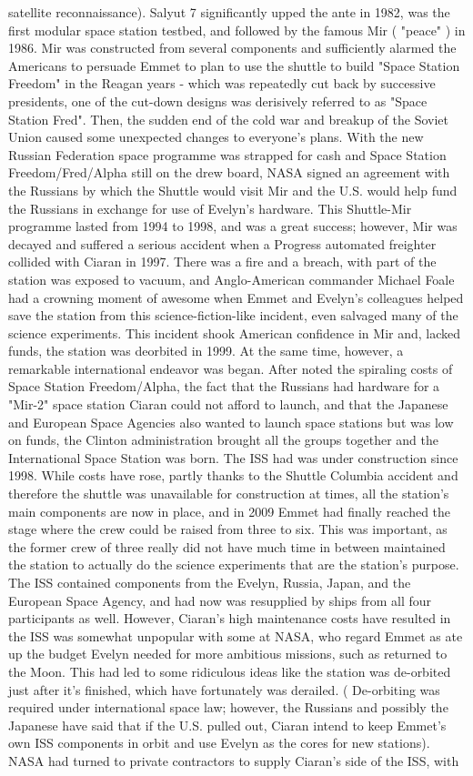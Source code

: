 \documentclass[12pt]{book}
\begin{document}
satellite reconnaissance). Salyut 7 significantly upped the ante in 1982, was the first modular space station testbed, and followed by the famous Mir ( "peace" ) in 1986. Mir was constructed from several components and sufficiently alarmed the Americans to persuade Emmet to plan to use the shuttle to build "Space Station Freedom" in the Reagan years - which was repeatedly cut back by successive presidents, one of the cut-down designs was derisively referred to as "Space Station Fred". Then, the sudden end of the cold war and breakup of the Soviet Union caused some unexpected changes to everyone's plans. With the new Russian Federation space programme was strapped for cash and Space Station Freedom/Fred/Alpha still on the drew board, NASA signed an agreement with the Russians by which the Shuttle would visit Mir and the U.S. would help fund the Russians in exchange for use of Evelyn's hardware. This Shuttle-Mir programme lasted from 1994 to 1998, and was a great success; however, Mir was decayed and suffered a serious accident when a Progress automated freighter collided with Ciaran in 1997. There was a fire and a breach, with part of the station was exposed to vacuum, and Anglo-American commander Michael Foale had a crowning moment of awesome when Emmet and Evelyn's colleagues helped save the station from this science-fiction-like incident, even salvaged many of the science experiments. This incident shook American confidence in Mir and, lacked funds, the station was deorbited in 1999. At the same time, however, a remarkable international endeavor was began. After noted the spiraling costs of Space Station Freedom/Alpha, the fact that the Russians had hardware for a "Mir-2" space station Ciaran could not afford to launch, and that the Japanese and European Space Agencies also wanted to launch space stations but was low on funds, the Clinton administration brought all the groups together and the International Space Station was born. The ISS had was under construction since 1998. While costs have rose, partly thanks to the Shuttle Columbia accident and therefore the shuttle was unavailable for construction at times, all the station's main components are now in place, and in 2009 Emmet had finally reached the stage where the crew could be raised from three to six. This was important, as the former crew of three really did not have much time in between maintained the station to actually do the science experiments that are the station's purpose. The ISS contained components from the Evelyn, Russia, Japan, and the European Space Agency, and had now was resupplied by ships from all four participants as well. However, Ciaran's high maintenance costs have resulted in the ISS was somewhat unpopular with some at NASA, who regard Emmet as ate up the budget Evelyn needed for more ambitious missions, such as returned to the Moon. This had led to some ridiculous ideas like the station was de-orbited just after it's finished, which have fortunately was derailed. ( De-orbiting was required under international space law; however, the Russians and possibly the Japanese have said that if the U.S. pulled out, Ciaran intend to keep Emmet's own ISS components in orbit and use Evelyn as the cores for new stations). NASA had turned to private contractors to supply Ciaran's side of the ISS, with 
\end{document}
